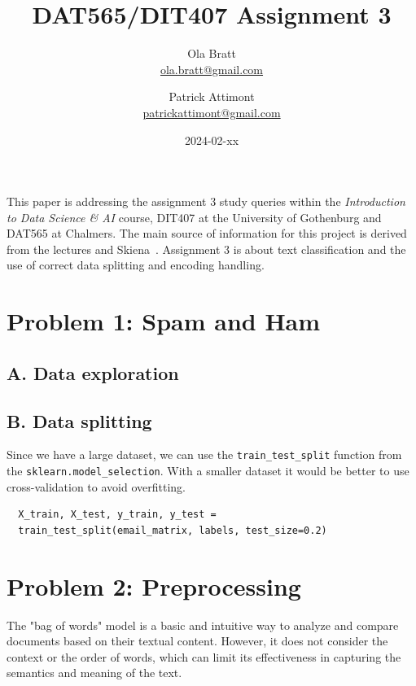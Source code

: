\documentclass[a4paper]{article}
\begin{document}
\author{Ola Bratt \\
  \href{mailto:ola.bratt@gmail.com}{ola.bratt@gmail.com}
  \and
  Patrick Attimont \\
  \href{patrickattimont@gmail.com}{patrickattimont@gmail.com}
}

\title{DAT565/DIT407 Assignment 3}
\date{2024-02-xx}

\maketitle

This paper is addressing the assignment 3 study queries within the \emph{Introduction to Data Science \& AI} course, DIT407 at 
the University of Gothenburg and DAT565 at Chalmers. The main source of information for this project
is derived from the lectures and Skiena~\cite{Skiena:2024}. Assignment 3 is about text classification and the 
use of correct data splitting and encoding handling.

\section*{Problem 1: Spam and Ham}

\subsection*{A. Data exploration}

\subsection*{B. Data splitting}
Since we have a large dataset, we can use the \texttt{train\_test\_split} function from the \texttt{sklearn.model\_selection}. With a smaller
dataset it would be better to use cross-validation to avoid overfitting.

\begin{verbatim}
  X_train, X_test, y_train, y_test = 
  train_test_split(email_matrix, labels, test_size=0.2)
\end{verbatim}
\section*{Problem 2: Preprocessing}
The "bag of words" model is a basic and intuitive way to analyze and compare documents based on their textual content. 
However, it does not consider the context or the order of words, which can limit its effectiveness in capturing the semantics 
and meaning of the text.
\end{document}
